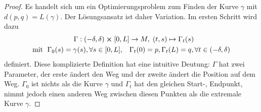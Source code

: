 \documentclass[../H_Analysis_main.tex]{subfiles}
\begin{document}
\begin{proof}
Es handelt sich um ein Optimierungsproblem zum Finden der Kurve $\gamma$ mit $d(p, q) = L(\gamma)$. Der Lösungsansatz ist daher Variation. Im ersten Schritt wird dazu
\begin{align*}
\Gamma: (-\delta, \delta) \cross [0, L] &\rightarrow M, \; (t, s) \mapsto \Gamma_t(s)
\\
\text{mit } \; \Gamma_0(s) = \gamma(s), \forall s \in [0, L], \quad &\Gamma_t(0) = p, \Gamma_t(L) = q, \forall t \in (-\delta, \delta)
\end{align*}
definiert. Diese komplizierte Definition hat eine intuitive Deutung: $\Gamma$ hat zwei Parameter, der erste ändert den Weg und der zweite ändert die Position auf dem Weg. $\Gamma_0$ ist nichts als die Kurve $\gamma$ und $\Gamma_t$ hat den gleichen Start-, Endpunkt, nimmt jedoch einen anderen Weg zwischen diesen Punkten als die extremale Kurve $\gamma$.


\end{proof}
\end{document}
